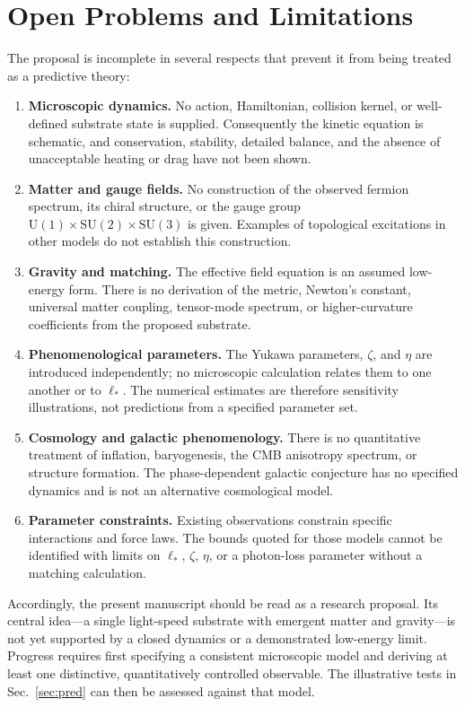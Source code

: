 \documentclass[11pt,a4paper]{article}
\begin{document}
\section{Open Problems and Limitations}\label{sec:open}

The proposal is incomplete in several respects that prevent it from being treated as a predictive
theory:
\begin{enumerate}
\item \textbf{Microscopic dynamics.} No action, Hamiltonian, collision kernel, or well-defined
substrate state is supplied. Consequently the kinetic equation is schematic, and conservation,
stability, detailed balance, and the absence of unacceptable heating or drag have not been shown.
\item \textbf{Matter and gauge fields.} No construction of the observed fermion spectrum, its
chiral structure, or the gauge group $\mathrm{U}(1)\times\mathrm{SU}(2)\times\mathrm{SU}(3)$ is
given. Examples of topological excitations in other models do not establish this construction.
\item \textbf{Gravity and matching.} The effective field equation is an assumed low-energy form.
There is no derivation of the metric, Newton's constant, universal matter coupling, tensor-mode
spectrum, or higher-curvature coefficients from the proposed substrate.
\item \textbf{Phenomenological parameters.} The Yukawa parameters, $\zeta$, and $\eta$ are
introduced independently; no microscopic calculation relates them to one another or to
$\ell_\ast$. The numerical estimates are therefore sensitivity illustrations, not predictions
from a specified parameter set.
\item \textbf{Cosmology and galactic phenomenology.} There is no quantitative treatment of
inflation, baryogenesis, the CMB anisotropy spectrum, or structure formation. The phase-dependent
galactic conjecture has no specified dynamics and is not an alternative cosmological model.
\item \textbf{Parameter constraints.} Existing observations constrain specific interactions and
force laws. The bounds quoted for those models cannot be identified with limits on
$\ell_\ast$, $\zeta$, $\eta$, or a photon-loss parameter without a matching calculation.
\end{enumerate}

Accordingly, the present manuscript should be read as a research proposal. Its central idea---a
single light-speed substrate with emergent matter and gravity---is not yet supported by a closed
dynamics or a demonstrated low-energy limit. Progress requires first specifying a consistent
microscopic model and deriving at least one distinctive, quantitatively controlled observable.
The illustrative tests in Sec.~\ref{sec:pred} can then be assessed against that model.
\end{document}
